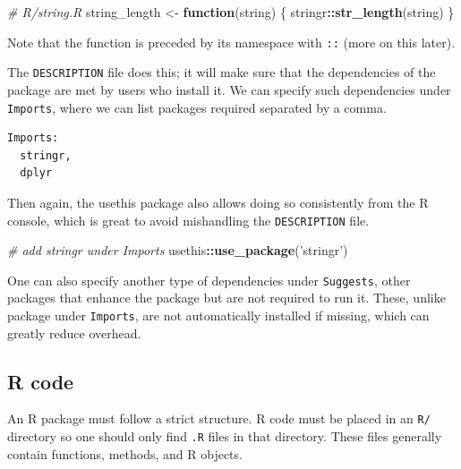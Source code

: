 \documentclass[10pt,]{krantz}
\makeatletter
\newenvironment{Shaded}{\begin{snugshade}}{\end{snugshade}}
\newcommand{\CommentTok}[1]{\textcolor[rgb]{0.37,0.37,0.37}{\textit{#1}}}
\newcommand{\ControlFlowTok}[1]{\textcolor[rgb]{0.27,0.27,0.27}{\textbf{#1}}}
\newcommand{\KeywordTok}[1]{\textcolor[rgb]{0.27,0.27,0.27}{\textbf{#1}}}
\newcommand{\NormalTok}[1]{#1}
\newcommand{\OperatorTok}[1]{\textcolor[rgb]{0.43,0.43,0.43}{\textbf{#1}}}
\newcommand{\StringTok}[1]{\textcolor[rgb]{0.5,0.5,0.5}{#1}}
\newenvironment{kframe}{%
\medskip{}
\setlength{\fboxsep}{.8em}
 \def\at@end@of@kframe{}%
 \ifinner\ifhmode%
  \def\at@end@of@kframe{\end{minipage}}%
  \begin{minipage}{\columnwidth}%
 \fi\fi%
 \def\FrameCommand##1{\hskip\@totalleftmargin \hskip-\fboxsep
 \colorbox{shadecolor}{##1}\hskip-\fboxsep
     \hskip-\linewidth \hskip-\@totalleftmargin \hskip\columnwidth}%
 \MakeFramed {\advance\hsize-\width
   \@totalleftmargin\z@ \linewidth\hsize
   \@setminipage}}%
 {\par\unskip\endMakeFramed%
 \at@end@of@kframe}
\renewenvironment{Shaded}{\begin{kframe}}{\end{kframe}}
\newenvironment{rmdblock}[1]
  {
  \begin{itemize}
  \renewcommand{\labelitemi}{
    \raisebox{-.7\height}[0pt][0pt]{
      {\setkeys{Gin}{width=3em,keepaspectratio}\texttt{[image: images/\#1]}}
    }
  }
  \setlength{\fboxsep}{1em}
  \begin{kframe}
  \item
  }
  {
  \end{kframe}
  \end{itemize}
  }
\newenvironment{rmdnote}
  {\begin{rmdblock}{note}}
  {\end{rmdblock}}
\makeatother
\begin{document}
\begin{Shaded}
\begin{Highlighting}[]
\CommentTok{# R/string.R}
\NormalTok{string_length <-}\StringTok{ }\ControlFlowTok{function}\NormalTok{(string) \{}
\NormalTok{  stringr}\OperatorTok{::}\KeywordTok{str_length}\NormalTok{(string)}
\NormalTok{\}}
\end{Highlighting}
\end{Shaded}

\begin{rmdnote}
Note that the function is preceded by its namespace with \texttt{::}
(more on this later).
\end{rmdnote}

The \texttt{DESCRIPTION} file does this; it will make sure that the dependencies of the package are met by users who install it. We can specify such dependencies under \texttt{Imports}, where we can list packages required separated by a comma.

\begin{verbatim}
Imports:
  stringr,
  dplyr
\end{verbatim}

Then again, the usethis package also allows doing so consistently from the R console, which is great to avoid mishandling the \texttt{DESCRIPTION} file.

\begin{Shaded}
\begin{Highlighting}[]
\CommentTok{# add stringr under Imports}
\NormalTok{usethis}\OperatorTok{::}\KeywordTok{use_package}\NormalTok{(}\StringTok{'stringr'}\NormalTok{)}
\end{Highlighting}
\end{Shaded}

One can also specify another type of dependencies under \texttt{Suggests}, other packages that enhance the package but are not required to run it. These, unlike package under \texttt{Imports}, are not automatically installed if missing, which can greatly reduce overhead.

\hypertarget{basics-r-code}{%
\subsection{R code}\label{basics-r-code}}

An R package must follow a strict structure. R code must be placed in an \texttt{R/} directory so one should only find \texttt{.R} files in that directory. These files generally contain functions, methods, and R objects.
\end{document}
